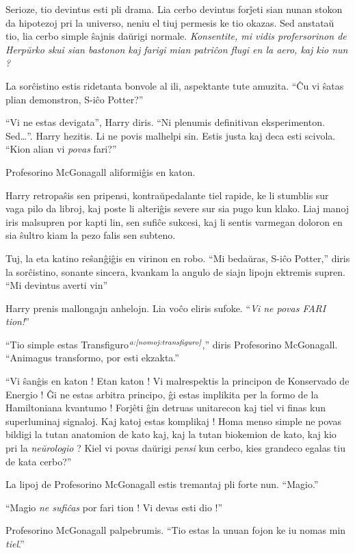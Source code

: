 Serioze, tio devintus esti pli drama. Lia cerbo devintus forĵeti
sian nunan stokon da hipotezoj pri la universo, neniu el tiuj permesis
ke tio okazas. Sed anstataŭ tio, lia cerbo simple ŝajnis daŭrigi
normale. \emph{Konsentite, mi vidis profersorinon de Herpŭrko skui
sian bastonon kaj farigi mian patriĉon flugi en la aero, kaj kio nun ?}

La sorĉistino estis ridetanta bonvole al ili, aspektante tute amuzita. ``Ĉu
vi ŝatas plian demonstron, S-iĉo Potter?''

``Vi ne estas devigata'', Harry diris. ``Ni plenumis definitivan
eksperimenton. Sed\ldots''. Harry hezitis. Li ne povis malhelpi sin. Estis
justa kaj deca esti scivola. ``Kion alian vi \emph{povas} fari?''

Profesorino McGonagall aliformiĝis en katon.

Harry retropaŝis sen pripensi, kontraŭpedalante tiel rapide, ke li
stumblis sur vaga pilo da libroj, kaj poste li alteriĝis severe sur
sia pugo kun klako. Liaj manoj iris malsupren por kapti lin, sen
sufiĉe sukcesi, kaj li sentis varmegan doloron en sia ŝultro kiam la
pezo falis sen subteno.

Tuj, la eta katino reŝanĝiĝis en virinon en robo. ``Mi bedaŭras,
S-iĉo Potter,'' diris la sorĉistino, sonante sincera, kvankam la
angulo de siajn lipojn ektremis supren. ``Mi devintus averti vin''

Harry prenis mallongajn anhelojn. Lia voĉo eliris
sufoke. ``\emph{Vi ne povas FARI tion!}''

``Tio simple estas Transfiguro$^{\textit{a:\ref{nomoj:transfiguro}}}$,'' diris Profesorino McGonagall. ``Animagus transformo, por esti ekzakta.'' 

``Vi ŝanĝis en katon ! Etan katon ! Vi malrespektis la principon de
Konservado de Energio ! Ĝi ne estas arbitra principo, ĝi estas
implikita per la formo de la Hamiltoniana kvantumo ! Forjêti ĝin
detruas unitarecon kaj tiel vi finas kun superluminaj signaloj. Kaj
katoj estas komplikaj ! Homa menso simple ne povas bildigi la tutan
anatomion de kato kaj, kaj la tutan biokemion de kato, kaj kio pri la
\emph{neŭrologio} ? Kiel vi povas daŭrigi \emph{pensi} kun cerbo, kies
grandeco egalas tiu de kata cerbo?''

La lipoj de Profesorino McGonagall estis tremantaj pli forte nun. ``Magio.''

``Magio \emph{ne sufiĉas} por fari tion ! Vi devas esti dio !''

Profesorino McGonagall palpebrumis. ``Tio estas la unuan fojon ke iu nomas min \emph{tiel}.''

